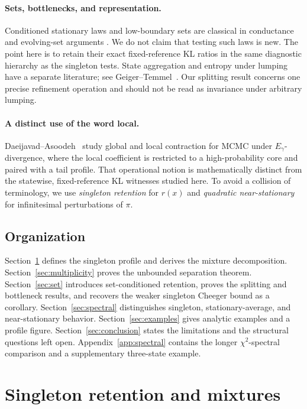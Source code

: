 \documentclass[11pt]{article}
\begin{document}
\paragraph{Sets, bottlenecks, and representation.}
Conditioned stationary laws and low-boundary sets are classical in
conductance and evolving-set arguments
\cite{LawlerSokal1988,MorrisPeres2005,LevinPeres2017,Montenegro2007}.
We do not claim that testing such laws is new.  The point here is to retain
their exact fixed-reference KL ratios in the same diagnostic hierarchy as
the singleton tests.  State aggregation and entropy under lumping have a
separate literature; see Geiger--Temmel~\cite{GeigerTemmel2014}.  Our
splitting result concerns one precise refinement operation and should not
be read as invariance under arbitrary lumping.

\paragraph{A distinct use of the word local.}
Daeijavad--Asoodeh~\cite{DaeijavadAsoodeh2026} study global and local
contraction for MCMC under \(E_\gamma\)-divergence, where the local
coefficient is restricted to a high-probability core and paired with a
tail profile.  That operational notion is mathematically distinct from
the statewise, fixed-reference KL witnesses studied here.  To avoid a
collision of terminology, we use \emph{singleton retention} for \(r(x)\)
and \emph{quadratic near-stationary} for infinitesimal perturbations of
\(\pi\).

\subsection{Organization}

Section~\ref{sec:singleton} defines the singleton profile and derives the
mixture decomposition.  Section~\ref{sec:multiplicity} proves the
unbounded separation theorem.  Section~\ref{sec:set} introduces
set-conditioned retention, proves the splitting and bottleneck results,
and recovers the weaker singleton Cheeger bound as a corollary.
Section~\ref{sec:spectral} distinguishes singleton, stationary-average, and
near-stationary behavior.  Section~\ref{sec:examples} gives analytic examples
and a profile figure.
Section~\ref{sec:conclusion} states the limitations and the structural
questions left open.  Appendix~\ref{app:spectral} contains the longer
\(\chi^2\)-spectral comparison and a supplementary three-state example.


\section{Singleton retention and mixtures}
\label{sec:singleton}
\end{document}
